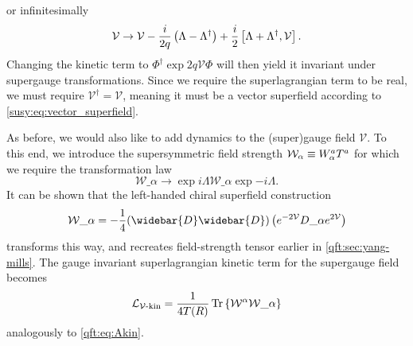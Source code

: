 \documentclass[../main.tex]{subfiles}
\begin{document}
or infinitesimally
\begin{equation}
  \mathcal{V} \to \mathcal{V} - \frac{i}{2q} \left(\Lambda - \Lambda^\dagger\right) + \frac{i}{2} \left[\Lambda + \Lambda^\dagger,\mathcal{V}\right].
\end{equation}
Changing the kinetic term to \(\Phi^\dagger \exp{2q\mathcal{V}} \Phi\) will then yield it invariant under supergauge transformations.
Since we require the superlagrangian term to be real, we must require \(\mathcal{V}^\dagger = \mathcal{V}\), meaning it must be a vector superfield according to \cref{susy:eq:vector_superfield}.

As before, we would also like to add dynamics to the (super)gauge field \(\mathcal{V}\).
To this end, we introduce the supersymmetric field strength \(\mathcal{W}_\alpha \equiv W\indices*{^a_\alpha} T^a\) for which we require the transformation law
\begin{equation}
  \mathcal{W}\_\alpha \to \exp{i\Lambda} \mathcal{W}\_\alpha \exp{-i\Lambda}.
\end{equation}
It can be shown that the left-handed chiral superfield construction
\begin{equation}
  \label{susy:eq:superfield_strenth}
  \mathcal{W}\_\alpha = -\frac{1}{4} (\widebar{D}\widebar{D}) \pclosed{\exp{-2\mathcal{V}} D\_\alpha \exp{2\mathcal{V}}}
\end{equation}
transforms this way, and recreates field-strength tensor earlier in \cref{qft:sec:yang-mills}.\cite{Martin:1997ns}
The gauge invariant superlagrangian kinetic term for the supergauge field becomes
\begin{equation}
  \label{susy:eq:Vkin}
  \L_{\mathcal{V}\text{-kin}} = \frac{1}{4 T(R)} \tr\cclosed{ \mathcal{W}\^\alpha \mathcal{W}\_\alpha }
\end{equation}
analogously to \cref{qft:eq:Akin}.
\\
\end{document}
